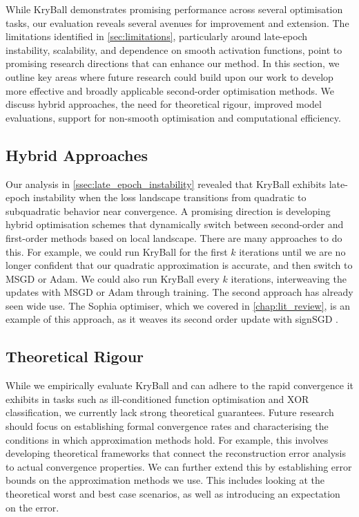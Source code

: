 While KryBall demonstrates promising performance across several optimisation tasks, our evaluation reveals several avenues for improvement and extension. The limitations identified in \cref{sec:limitations}, particularly around late-epoch instability, scalability, and dependence on smooth activation functions, point to promising research directions that can enhance our method. In this section, we outline key areas where future research could build upon our work to develop more effective and broadly applicable second-order optimisation methods. We discuss hybrid approaches, the need for theoretical rigour, improved model evaluations, support for non-smooth optimisation and computational efficiency.

\subsection{Hybrid Approaches}
\label{ssec:hybrid_approaches}

Our analysis in \cref{ssec:late_epoch_instability} revealed that KryBall exhibits late-epoch instability when the loss landscape transitions from quadratic to subquadratic behavior near convergence. A promising direction is developing hybrid optimisation schemes that dynamically switch between second-order and first-order methods based on local landscape. There are many approaches to do this. For example, we could run KryBall for the first $k$ iterations until we are no longer confident that our quadratic approximation is accurate, and then switch to MSGD or Adam. We could also run KryBall every $k$ iterations, interweaving the updates with MSGD or Adam through training. The second approach has already seen wide use. The Sophia optimiser, which we covered in \cref{chap:lit_review}, is an example of this approach, as it weaves its second order update with signSGD \citep{liu2023sophia}.

\subsection{Theoretical Rigour}
\label{sec:theoretical_rigour}

While we empirically evaluate KryBall and can adhere to the rapid convergence it exhibits in tasks such as ill-conditioned function optimisation and XOR classification, we currently lack strong theoretical guarantees. Future research should focus on establishing formal convergence rates and characterising the conditions in which approximation methods hold. For example, this involves developing theoretical frameworks that connect the reconstruction error analysis to actual convergence properties. We can further extend this by establishing error bounds on the approximation methods we use. This includes looking at the theoretical worst and best case scenarios, as well as introducing an expectation on the error. 

